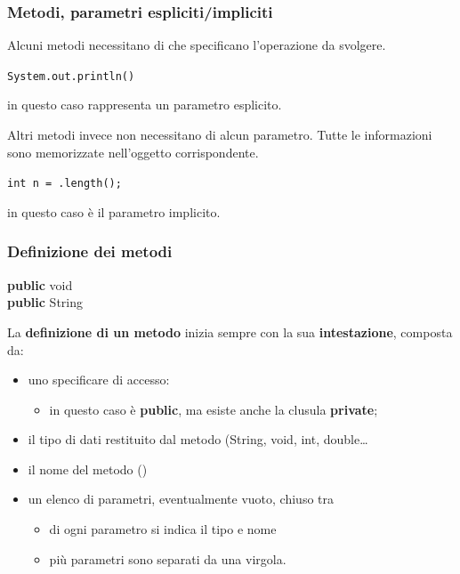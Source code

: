 \begin{frame}
\frametitle{Metodi, parametri espliciti/impliciti}
\begin{block}{}
Alcuni metodi necessitano di  che specificano l'operazione da svolgere.
\begin{center}
\texttt{System.out.println()}
\end{center}
 in questo caso rappresenta un parametro esplicito.
\end{block}
\begin{block}{}
Altri metodi invece non necessitano di alcun parametro. Tutte le informazioni sono memorizzate nell'oggetto corrispondente.
\begin{center}
\texttt{int n = .length();}
\end{center}
 in questo caso è il parametro implicito.
\end{block}
\end{frame}

\begin{frame}
\frametitle{Definizione dei metodi}
\begin{block}{}
\textbf{public} \alert{void} \\
\textbf{public} \alert{String} 
\end{block}
\begin{block}{}
La \textbf{definizione di un metodo} inizia sempre con la sua \textbf{intestazione}, composta da:
\begin{itemize}
\item uno specificare di accesso:
\begin{itemize}
\item in questo caso è \textbf{public}, ma esiste anche la clusula \textbf{private};
\end{itemize}
\item il tipo di dati restituito dal metodo (\alert{String, void, int, double\ldots}
\item il nome del metodo ()
\item un elenco di parametri, eventualmente vuoto, chiuso tra 
\begin{itemize}
\item di ogni parametro si indica il tipo e nome
\item più parametri sono separati da una virgola.
\end{itemize}
\end{itemize}
\end{block}
\end{frame}

